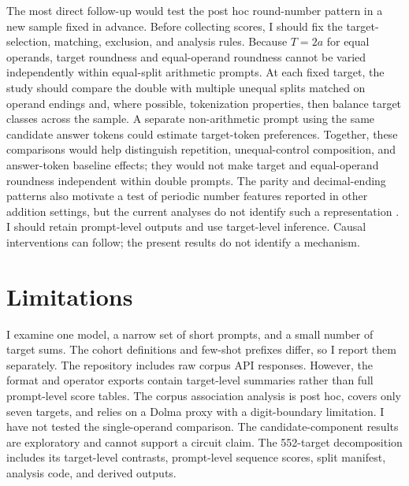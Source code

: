 \documentclass[11pt]{article}
\begin{document}
The most direct follow-up would test the post hoc round-number pattern in a new sample fixed in advance. Before collecting scores, I should fix the target-selection, matching, exclusion, and analysis rules. Because $T=2a$ for equal operands, target roundness and equal-operand roundness cannot be varied independently within equal-split arithmetic prompts. At each fixed target, the study should compare the double with multiple unequal splits matched on operand endings and, where possible, tokenization properties, then balance target classes across the sample. A separate non-arithmetic prompt using the same candidate answer tokens could estimate target-token preferences. Together, these comparisons would help distinguish repetition, unequal-control composition, and answer-token baseline effects; they would not make target and equal-operand roundness independent within double prompts. The parity and decimal-ending patterns also motivate a test of periodic number features reported in other addition settings, but the current analyses do not identify such a representation \cite{zhou2024fourier,kantamneni2025trigonometry}. I should retain prompt-level outputs and use target-level inference. Causal interventions can follow; the present results do not identify a mechanism.

\section{Limitations}

I examine one model, a narrow set of short prompts, and a small number of target sums. The cohort definitions and few-shot prefixes differ, so I report them separately. The repository includes raw corpus API responses. However, the format and operator exports contain target-level summaries rather than full prompt-level score tables. The corpus association analysis is post hoc, covers only seven targets, and relies on a Dolma proxy with a digit-boundary limitation. I have not tested the single-operand comparison. The candidate-component results are exploratory and cannot support a circuit claim. The 552-target decomposition includes its target-level contrasts, prompt-level sequence scores, split manifest, analysis code, and derived outputs.
\end{document}
